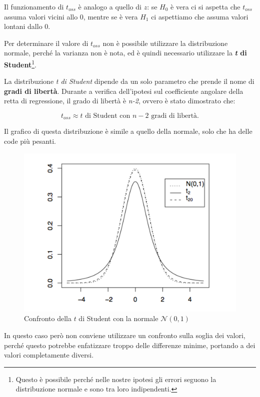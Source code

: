 Il funzionamento di $ t_{oss} $ è analogo a quello di $ z $: se $ H_0 $ è vera ci si aspetta che $ t_{oss} $ assuma valori vicini allo 0, mentre se è vera $ H_1 $ ci aspettiamo che assuma valori lontani dallo 0.

Per determinare il valore di $ t_{oss} $ non è possibile utilizzare la distribuzione normale, perché la varianza non è nota, ed è quindi necessario utilizzare la \textbf{\textit{t} di Student}\footnote{Questo è possibile perché nelle nostre ipotesi gli errori seguono la distribuzione normale e sono tra loro indipendenti.}.

La distribuzione \emph{t di Student} dipende da un solo parametro che
prende il nome di \textbf{gradi di libertà}. Durante a verifica
dell'ipotesi sul coefficiente angolare della retta di regressione, il
grado di libertà è \emph{n-2}, ovvero è stato dimostrato che:

$$
t_{oss} \approx t \text{ di Student con } n - 2 \text{ gradi di libertà.}
$$

Il grafico di questa distribuzione è simile a quello della normale, solo
che ha delle code più pesanti.

\begin{figure}[htbp]
\centering
\includegraphics{./notes/immagini/l6-fig5.png}
\caption{Confronto della $ t $ di Student con la normale $ \mathcal{N}(0,1) $}
\end{figure}

In questo caso però non conviene utilizzare un confronto sulla soglia dei valori, perché questo potrebbe enfatizzare troppo delle differenze minime, portando a dei valori completamente diversi.

